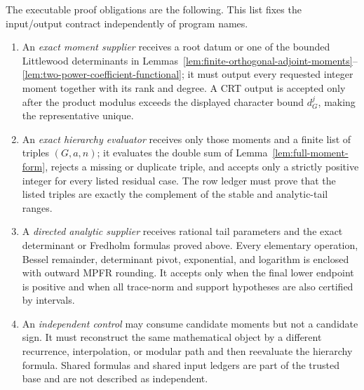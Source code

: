 \documentclass[11pt,reqno]{amsart}
\theoremstyle{plain}
\theoremstyle{definition}
\begin{document}
The executable proof obligations are the following.  This list fixes the
input/output contract independently of program names.
\begin{enumerate}
\item An \emph{exact moment supplier} receives a root datum or one of the
bounded Littlewood determinants in
Lemmas~\ref{lem:finite-orthogonal-adjoint-moments}--
\ref{lem:two-power-coefficient-functional}; it must output every requested
integer moment together with its rank and degree.  A CRT output is accepted
only after the product modulus exceeds the displayed character bound
\(d_G^j\), making the representative unique.
\item An \emph{exact hierarchy evaluator} receives only those moments and a
finite list of triples \((G,a,n)\); it evaluates the double sum of
Lemma~\ref{lem:full-moment-form}, rejects a missing or duplicate triple, and
accepts only a strictly positive integer for every listed residual case.
The row ledger must prove that the listed triples are exactly the complement
of the stable and analytic-tail ranges.
\item A \emph{directed analytic supplier} receives rational tail parameters
and the exact determinant or Fredholm formulas proved above.  Every elementary
operation, Bessel remainder, determinant pivot, exponential, and logarithm
is enclosed with outward MPFR rounding.  It accepts only when the final lower
endpoint is positive and when all trace-norm and support hypotheses are also
certified by intervals.
\item An \emph{independent control} may consume candidate moments but not a
candidate sign.  It must reconstruct the same mathematical object by a
different recurrence, interpolation, or modular path and then reevaluate the
hierarchy formula.  Shared formulas and shared input ledgers are part of the
trusted base and are not described as independent.
\end{enumerate}
\end{document}
